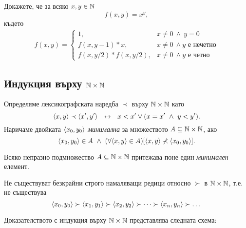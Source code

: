 \begin{problem}
  Докажете, че за всяко $x,y\in\Nat$
  \[f(x,y) = x^y,\]
  където
  \begin{align*}
    f(x,y) = 
    \begin{cases}
      1, & x\neq 0\ \wedge\ y = 0\\
      f(x,y-1) * x, & x\neq 0\ \wedge y\mbox{ е нечетно}\\
      f(x,y/2) * f(x,y/2), & x\neq 0\ \wedge y\mbox{ е четно}
    \end{cases}
  \end{align*}
\end{problem}



\subsection*{Индукция върху $\Nat\times\Nat$}

\begin{dfn}
  Определяме лексикографската наредба $\prec$ върху $\Nat\times\Nat$ като
  \[\pair{x,y} \prec \pair{x^\prime,y^\prime}\ \iff\ x < x^\prime \vee (x = x^\prime\ \wedge\ y < y^\prime).\]
  Наричаме двойката $\pair{x_0,y_0}$ {\em минимална} за множеството $A \subseteq \Nat\times\Nat$, ако
  \[\pair{x_0,y_0}\in A\ \wedge\ (\forall \pair{x,y}\in A)[\pair{x,y}\not\prec\pair{x_0,y_0}].\]
\end{dfn}

\begin{prop}
  Всяко непразно подмножество $A\subseteq \Nat\times \Nat$ притежава поне един {\em минимален} елемент.
\end{prop}

\begin{prop}
  Не съществуват безкрайни строго намаляващи редици относно $\succ$ в $\Nat\times\Nat$, т.е.
  не съществува 
  \[\pair{x_0,y_0} \succ \pair{x_1,y_1}\succ \pair{x_2,y_2} \succ \dots \succ \pair{x_n,y_n}\succ\dots\]
\end{prop}

\begin{dfn}
  Доказателството с индукция върху $\Nat\times\Nat$ представлява следната схема:
  \begin{prooftree}
  \end{prooftree}  
\end{dfn}

